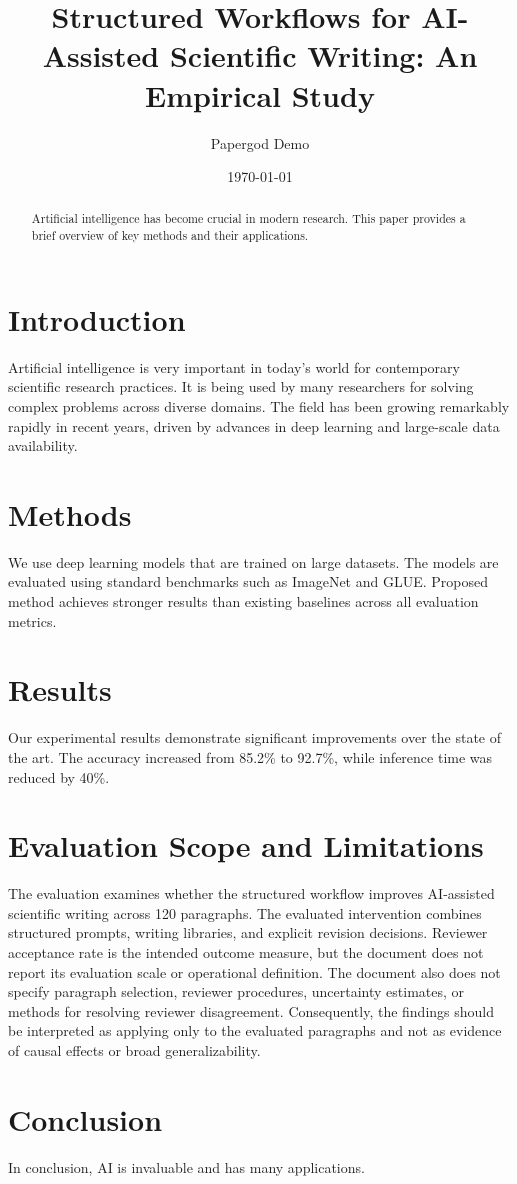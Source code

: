 \documentclass{article}
\title{Structured Workflows for AI-Assisted Scientific Writing: An Empirical Study}
\author{Papergod Demo}
\date{\today}
\begin{document}
\maketitle

\begin{abstract}
Artificial intelligence has become crucial in modern research. This paper provides a brief overview of key methods and their applications.
\end{abstract}

\section{Introduction}
Artificial intelligence is very important in today's world for contemporary scientific research practices. It is being used by many researchers for solving complex problems across diverse domains. The field has been growing remarkably rapidly in recent years, driven by advances in deep learning and large-scale data availability.

\section{Methods}
We use deep learning models that are trained on large datasets. The models are evaluated using standard benchmarks such as ImageNet and GLUE. Proposed method achieves stronger results than existing baselines across all evaluation metrics.

\section{Results}
Our experimental results demonstrate significant improvements over the state of the art. The accuracy increased from 85.2\% to 92.7\%, while inference time was reduced by 40\%.

\section{Evaluation Scope and Limitations}
The evaluation examines whether the structured workflow improves AI-assisted scientific writing across 120 paragraphs. The evaluated intervention combines structured prompts, writing libraries, and explicit revision decisions. Reviewer acceptance rate is the intended outcome measure, but the document does not report its evaluation scale or operational definition. The document also does not specify paragraph selection, reviewer procedures, uncertainty estimates, or methods for resolving reviewer disagreement. Consequently, the findings should be interpreted as applying only to the evaluated paragraphs and not as evidence of causal effects or broad generalizability.

\section{Conclusion}
In conclusion, AI is invaluable and has many applications.
\end{document}
